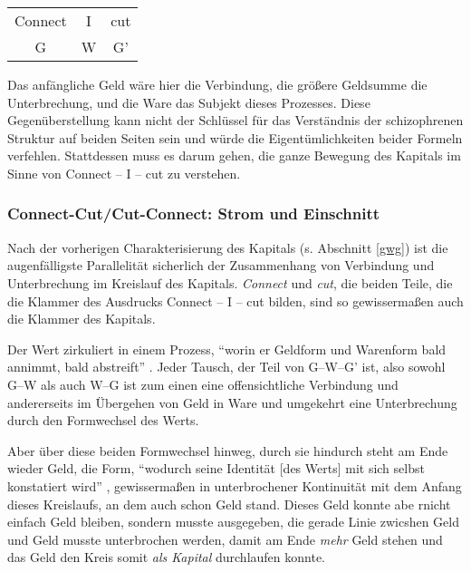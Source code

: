 \documentclass[12pt,
               DIV13,
               paper=a4,
               twoside=false,
               onehalfspacing,
               bibliography=totoc,
               toc=graduated,
               draft,
               ]{scrartcl}
\newcommand{\pc}[2]{\parencite[#1]{#2}}
\newcommand{\worries}[1]{\ifdraft{\textcolor{blue}{\texttt{(#1)}}}{}}
\newcommand{\gwg}{G--W--G'\xspace}
\newcommand{\cic}{Connect -- I -- cut\xspace}
\begin{document}
{\centering\hfill
\begin{tabular}{c@{ -- }c@{ -- }c}
Connect & I & cut\\
G & W & G'
\end{tabular}
\hfill}

Das anfängliche Geld wäre hier die Verbindung, die größere Geldsumme
die Unterbrechung, und die Ware das Subjekt dieses Prozesses. Diese
Gegenüberstellung kann nicht der Schlüssel für das Verständnis der
schizophrenen Struktur auf beiden Seiten sein und würde die
Eigentümlichkeiten beider Formeln verfehlen. Stattdessen muss es darum
gehen, die ganze Bewegung des Kapitals im Sinne von \cic zu verstehen.

\worries{Genauer!}



\subsubsection{Connect-Cut/Cut-Connect: Strom und Einschnitt}


Nach der vorherigen Charakterisierung des Kapitals (s. Abschnitt \ref{gwg}) ist
die augenfälligste Parallelität sicherlich der Zusammenhang von
Verbindung und Unterbrechung im Kreislauf des Kapitals. \emph{Connect}
und \emph{cut}, die beiden Teile, die die Klammer des Ausdrucks \cic
bilden, sind so gewissermaßen auch die Klammer des Kapitals.

Der Wert zirkuliert in einem Prozess, "`worin er Geldform und
Warenform bald annimmt, bald abstreift"' \pc{169}{kap}. Jeder Tausch,
der Teil von \gwg ist, also sowohl G--W als auch W--G ist zum einen
eine offensichtliche Verbindung \worries{...} und andererseits im
Übergehen von Geld in Ware und umgekehrt eine Unterbrechung durch den
Formwechsel des Werts.

Aber über diese beiden Formwechsel hinweg, durch sie hindurch steht am
Ende wieder Geld, die Form, "`wodurch seine Identität [des Werts] mit
sich selbst konstatiert wird"' \pc{169}{kap}, gewissermaßen in
unterbrochener Kontinuität mit dem Anfang dieses Kreislaufs, an dem
auch schon Geld stand. Dieses Geld konnte abe rnicht einfach Geld
bleiben, sondern musste ausgegeben, die gerade Linie zwicshen Geld und
Geld musste unterbrochen werden, damit am Ende \emph{mehr} Geld stehen
und das Geld den Kreis somit \emph{als Kapital} durchlaufen konnte.
\end{document}
